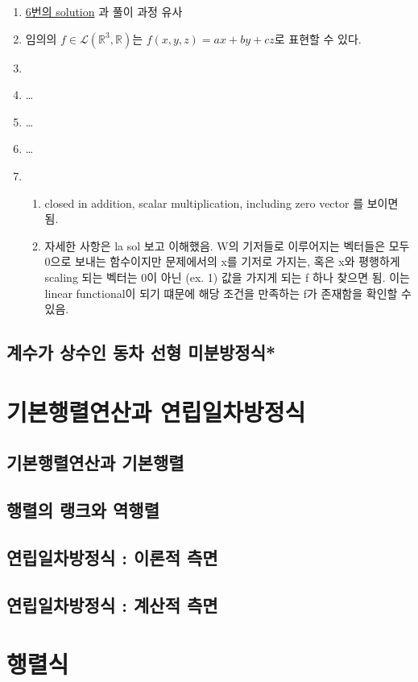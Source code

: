 \documentclass{oblivoir}
\begin{document}
\begin{enumerate}
    \item \hyperlink{2.6_6}{6번의 solution} 과 풀이 과정 유사
    \item 임의의 \(f \in \mathcal{L}(\mathbb{R}^3, \mathbb{R})\)는 \(f(x, y, z) = ax+by+cz\)로 표현할 수 있다.
    \item 
    \item \dots
    \item \dots 
    \item \dots
    \item 
    \begin{enumerate}
    \item closed in addition, scalar multiplication, including zero vector 를 보이면 됨.
    \item 자세한 사항은 la sol 보고 이해했음. W의 기저들로 이루어지는 벡터들은 모두 0으로 보내는 함수이지만 문제에서의 x를 기저로 가지는, 혹은 x와 평행하게 scaling 되는 벡터는 0이 아닌 (ex. 1) 값을 가지게 되는 f 하나 찾으면 됨. 이는 linear functional이 되기 떄문에 해당 조건을 만족하는 f가 존재함을 확인할 수 있음.
    \end{enumerate}
\end{enumerate}




\subsection{계수가 상수인 동차 선형 미분방정식*}

\newpage
\section{기본행렬연산과 연립일차방정식}
\subsection{기본행렬연산과 기본행렬}
\subsection{행렬의 랭크와 역행렬}
\subsection{연립일차방정식 : 이론적 측면}
\subsection{연립일차방정식 : 계산적 측면}

\newpage
\section{행렬식}
\end{document}

